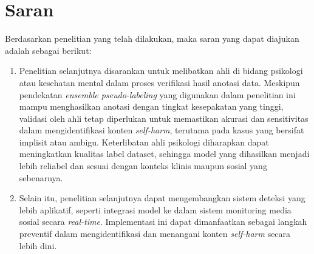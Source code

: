 \section{Saran} \label{V.Saran}
Berdasarkan penelitian yang telah dilakukan, maka saran yang dapat diajukan adalah sebagai berikut:


\begin{enumerate}
    \item Penelitian selanjutnya disarankan untuk melibatkan ahli di bidang psikologi atau kesehatan mental dalam proses verifikasi hasil anotasi data. Meskipun pendekatan \textit{ensemble pseudo-labeling} yang digunakan dalam penelitian ini mampu menghasilkan anotasi dengan tingkat kesepakatan yang tinggi, validasi oleh ahli tetap diperlukan untuk memastikan akurasi dan sensitivitas dalam mengidentifikasi konten \textit{self-harm}, terutama pada kasus yang bersifat implisit atau ambigu. Keterlibatan ahli psikologi diharapkan dapat meningkatkan kualitas label dataset, sehingga model yang dihasilkan menjadi lebih reliabel dan sesuai dengan konteks klinis maupun sosial yang sebenarnya.
    
    
 
    
    \item Selain itu, penelitian selanjutnya dapat mengembangkan sistem deteksi yang lebih aplikatif, seperti integrasi model ke dalam sistem monitoring media sosial secara \textit{real-time}. Implementasi ini dapat dimanfaatkan sebagai langkah preventif dalam mengidentifikasi dan menangani konten \textit{self-harm} secara lebih dini.
\end{enumerate}